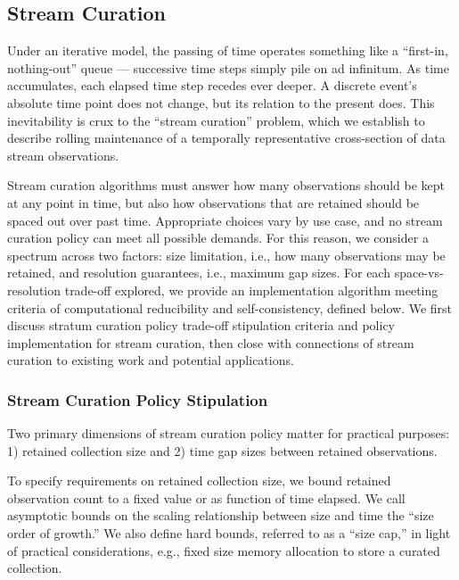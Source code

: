 \subsection{Stream Curation} \label{sec:streaming-curation}

Under an iterative model, the passing of time operates something like a ``first-in, nothing-out'' queue --- successive time steps simply pile on ad infinitum.
As time accumulates, each elapsed time step recedes ever deeper.
A discrete event's absolute time point does not change, but its relation to the present does.  %
This inevitability is crux to the ``stream curation'' problem, which we establish to describe rolling maintenance of a temporally representative cross-section of data stream observations.

Stream curation algorithms must answer how many observations should be kept at any point in time, but also how observations that are retained should be spaced out over past time.
Appropriate choices vary by use case, and no stream curation policy can meet all possible demands.
For this reason, we consider a spectrum across two factors: size limitation, i.e., how many observations may be retained, and resolution guarantees, i.e., maximum gap sizes.
For each space-vs-resolution trade-off explored, we provide an implementation algorithm meeting criteria of computational reducibility and self-consistency, defined below.
We first discuss stratum curation policy trade-off stipulation criteria and policy implementation for stream curation, then close with connections of stream curation to existing work and potential applications.

\subsubsection{Stream Curation Policy Stipulation}

Two primary dimensions of stream curation policy matter for practical purposes: 1) retained collection size and 2) time gap sizes between retained observations.

To specify requirements on retained collection size, we bound retained observation count to a fixed value or as function of time elapsed.
We call asymptotic bounds on the scaling relationship between size and time  the ``size order of growth.''
We also define hard bounds, referred to as a ``size cap,'' in light of practical considerations, e.g., fixed size memory allocation to store a curated collection.

